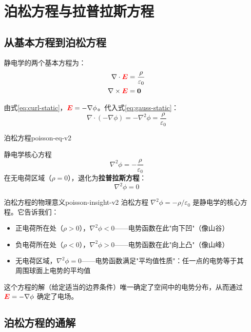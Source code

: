 \documentclass[11pt,a4paper,openany,oneside]{book}
\newcommand{\vecE}{\textcolor{red}{\vect{E}}}
\newcommand{\eps}{\varepsilon}
\newcommand{\vect}[1]{\bm{#1}}
\newcommand{\grad}{\nabla}
\newcommand{\curl}{\nabla\times}
\newcommand{\divg}{\nabla\cdot}
\newcommand{\lap}{\nabla^2}
\begin{document}
\section{泊松方程与拉普拉斯方程}

\subsection{从基本方程到泊松方程}

静电学的两个基本方程为：
\begin{align}
\divg\vecE &= \frac{\rho}{\eps_0} \label{eq:gauss-static} \\
\curl\vecE &= \vect{0} \label{eq:curl-static}
\end{align}

由式\eqref{eq:curl-static}，$\vecE = -\grad\phi$。代入式\eqref{eq:gauss-static}：
\[
\divg(-\grad\phi) = -\lap\phi = \frac{\rho}{\eps_0}
\]

\begin{theorem}{泊松方程}{poisson-eq-v2}
\begin{impEqbox}{静电学核心方程}
\begin{equation}
\lap\phi = -\frac{\rho}{\eps_0}\label{eq:poisson}
\end{equation}
在无电荷区域（$\rho = 0$），退化为\textbf{拉普拉斯方程}：
\[
\lap\phi = 0
\]
\end{impEqbox}
\end{theorem}

\begin{insight}{泊松方程的物理意义}{poisson-insight-v2}
泊松方程 $\lap\phi = -\rho/\eps_0$ 是静电学的核心方程。它告诉我们：
\begin{itemize}
\item 正电荷所在处（$\rho > 0$），$\lap\phi < 0$——电势函数在此"向下凹"（像山谷）
\item 负电荷所在处（$\rho < 0$），$\lap\phi > 0$——电势函数在此"向上凸"（像山峰）
\item 无电荷区域，$\lap\phi = 0$——电势函数满足"平均值性质"：任一点的电势等于其周围球面上电势的平均值
\end{itemize}

这个方程的解（给定适当的边界条件）唯一确定了空间中的电势分布，从而通过 $\vecE = -\grad\phi$ 确定了电场。
\end{insight}

\subsection{泊松方程的通解}
\end{document}
